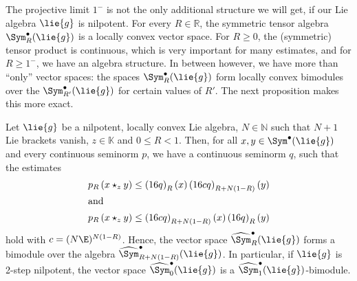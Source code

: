 The projective limit $1^-$ is not the only additional structure we will get, if 
our Lie algebra $\lie{g}$ is nilpotent. For every $R \in \mathbb{R}$, the 
symmetric tensor algebra $\Sym_R^{\bullet}(\lie{g})$ is a locally convex vector 
space. For $R \geq 0$, the (symmetric) tensor product is continuous, which is 
very important for many estimates, and for $R \geq 1^-$, we have an algebra 
structure. In between however, we have more than ``only'' vector spaces: the 
spaces $\Sym_R^{\bullet}(\lie{g})$ form locally convex bimodules over the 
$\Sym_{R'}^{\bullet}(\lie{g})$ for certain values of $R'$. The next proposition 
makes this more exact.
\begin{proposition}
	\label{Nilpot:Prop:Bimodules}
	Let $\lie{g}$ be a nilpotent, locally convex Lie algebra, $N \in 
	\mathbb{N}$ such that $N + 1$ Lie brackets vanish, $z \in \mathbb{K}$ and 
	$0 \leq R < 1$. Then, for all $x, y \in \Sym^{\bullet}(\lie{g})$ and every 
	continuous seminorm $p$, we have a continuous seminorm $q$, such that the 
	estimates
	\begin{align}
		\label{Nilpot:BimoduleEstimate1}
		p_R \left(
			x \star_z y
		\right)
		& \leq
		\left(16 q\right)_R(x) 
		\left(16 c q\right)_{R + N(1-R)}(y)
		\\
	\intertext{and}
		\label{Nilpot:BimoduleEstimate2}
		p_R \left(
			x \star_z y
		\right)
		& \leq
		\left(16 c q\right)_{R + N(1-R)}(x)
		\left(16 q\right)_R(y) 
	\end{align}
	hold with $c = (N \E)^{N (1- R)}$.
	Hence, the vector space $\widehat{\Sym}_R^{\bullet}(\lie{g})$ forms a 
	bimodule over the algebra $\widehat{\Sym}_{R + N(1-R)}^{\bullet}(\lie{g})$. 
	In particular, if $\lie{g}$ is 2-step nilpotent, 
	the vector space $\widehat{\Sym}_0^{\bullet}(\lie{g})$ is a 
	$\widehat{\Sym}_1^{\bullet}(\lie{g})$-bimodule.
\end{proposition}
